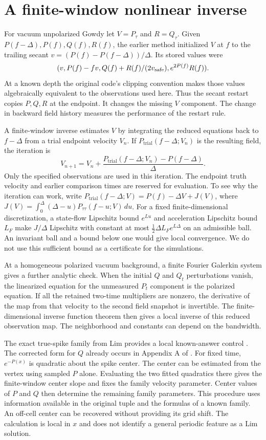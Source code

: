 \section{A finite-window nonlinear inverse}
\label{nonlinear}
For vacuum unpolarized Gowdy let $V=P_\tau$ and $R=Q_\tau$.
Given $P(f-\Delta),P(f),Q(f),R(f)$, the earlier method initialized
$V$ at $f$ to the trailing secant $v=(P(f)-P(f-\Delta))/\Delta$.
Its stored values were
\[
 (v, P(f)-fv, Q(f)+R(f)/(2v_{\rm safe}), e^{2P(f)}R(f)).
\]
At a known depth the original code's clipping convention makes
those values algebraically equivalent to the observations used
here. Thus the secant restart copies $P,Q,R$ at the endpoint.
It changes the missing $V$ component. The change in backward
field history measures the performance of the restart rule.

A finite-window inverse estimates $V$ by integrating the reduced
equations back to $f-\Delta$ from a trial endpoint velocity $V_n$.
If $P_{\mathrm{trial}}(f-\Delta;V_n)$ is the resulting field, the
iteration is
\[
 V_{n+1}=V_n+
 \frac{P_{\mathrm{trial}}(f-\Delta;V_n)-P(f-\Delta)}{\Delta}.
\]
Only the specified observations are used in this iteration.
The endpoint truth velocity and earlier comparison times are
reserved for evaluation. To see why the iteration can work, write
$P_{\mathrm{trial}}(f-\Delta;V)=P(f)-\Delta V+J(V)$, where
$J(V)=\int_0^\Delta(\Delta-u)P_{\tau\tau}(f-u;V)\,du$.
For a fixed finite-dimensional discretization, a state-flow
Lipschitz bound $e^{Lu}$ and acceleration Lipschitz bound $L_F$
make $J/\Delta$ Lipschitz with constant at most
$\frac12\Delta L_F e^{L\Delta}$ on an admissible ball. An
invariant ball and a bound below one would give local convergence.
We do not use this sufficient bound as a certificate for the
simulations.

At a homogeneous polarized vacuum background,
a finite Fourier Galerkin system gives a further analytic check.
When the initial $Q$ and $Q_t$ perturbations vanish, the
linearized equation for the unmeasured $P_t$ component
is the polarized equation. If all the retained two-time
multipliers are nonzero, the derivative of the map from that
velocity to the second field snapshot is invertible.
The finite-dimensional inverse function theorem then gives
a local inverse of this reduced observation map.
The neighborhood and constants can depend on the bandwidth.

The exact true-spike family from Lim provides a local
known-answer control \cite{lim,lim2}. The corrected form for
$Q$ already occurs in Appendix A of \cite{lim2}. For fixed
time, $e^{-P(x)}$ is quadratic about the spike center.
The center can be estimated from the vertex using sampled
$P$ alone. Evaluating the two fitted quadratics there gives
the finite-window center slope and fixes the family velocity
parameter. Center values of $P$ and $Q$ then determine the
remaining family parameters. This procedure uses information
available in the original tuple and the formulas of a known
family. An off-cell center can be recovered without providing
its grid shift. The calculation is local in $x$ and does not
identify a general periodic feature as a Lim solution.

